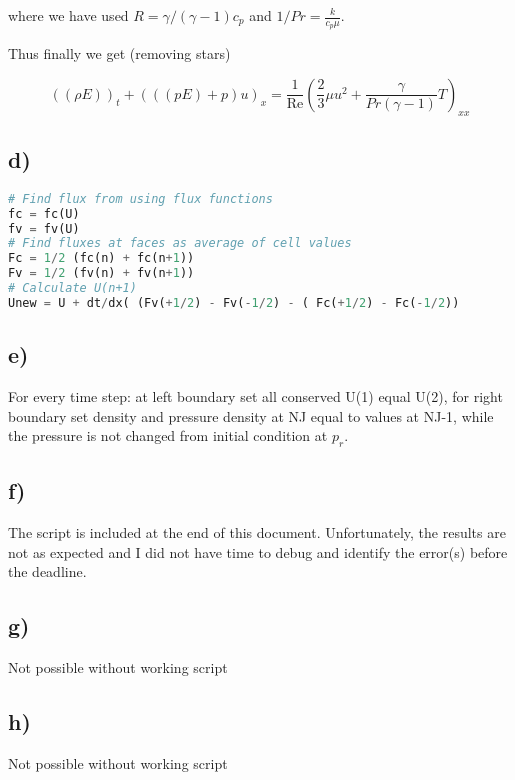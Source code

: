 \documentclass{article}
\renewcommand{\Re}{\text{Re}}
\begin{document}
where we have used $ R = \gamma/(\gamma-1) c_p$ and $1/Pr = \frac{k}{c_p \mu}$.

Thus finally we get (removing stars) 

\begin{equation}
 ((\rho E))_{t} +  ( ((pE)+p)u  )_{x} = \frac{1}{\Re} (\frac{2}{3}\mu  u^2 + \frac{\gamma}{Pr (\gamma-1)} T)_{xx}
\end{equation}

\subsection{d)}
\begin{lstlisting}[language=python]
# Find flux from using flux functions
fc = fc(U)
fv = fv(U)
# Find fluxes at faces as average of cell values
Fc = 1/2 (fc(n) + fc(n+1))
Fv = 1/2 (fv(n) + fv(n+1))
# Calculate U(n+1)
Unew = U + dt/dx( (Fv(+1/2) - Fv(-1/2) - ( Fc(+1/2) - Fc(-1/2))
\end{lstlisting}

\subsection{e)}
For every time step: at left boundary set all conserved U(1) equal U(2), for right boundary set density and pressure density at NJ equal to values at NJ-1, while the pressure is not changed from initial condition at $p_r$.

\subsection{f)}
The script is included at the end of this document. Unfortunately, the results are not as expected and I did not have time to debug and identify the error(s) before the deadline.

\subsection{g)}
Not possible without working script 

\subsection{h)}
Not possible without working script









\end{document}
